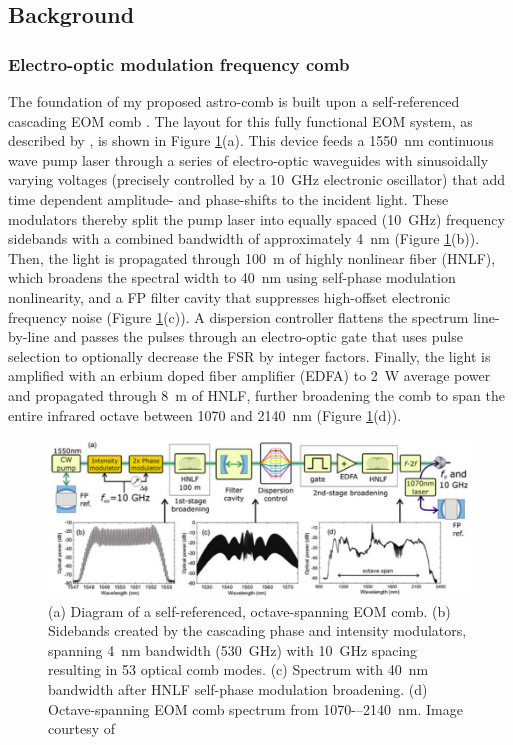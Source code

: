 \documentclass[11pt]{article}
\begin{document}
\subsection{Background}
\label{subsec:astro-comb_bkgd}

\subsubsection{Electro-optic modulation frequency comb}

The foundation of my proposed astro-comb is built upon a self-referenced cascading EOM comb \citep{Cole2015, Beha2017, Carlson2017a}. The layout for this fully functional EOM system, as described by \citet{Cole2015}, is shown in Figure \ref{fig:cole_eom}(a). This device feeds a \SI{1550}{\nano\meter} continuous wave pump laser through a series of electro-optic waveguides with sinusoidally varying voltages (precisely controlled by a \SI{10}{\giga\hertz} electronic oscillator) that add time dependent amplitude- and phase-shifts to the incident light. These modulators thereby split the pump laser into equally spaced (\SI{10}{\giga\hertz}) frequency sidebands with a combined bandwidth of approximately \SI{4}{\nano\meter} (Figure \ref{fig:cole_eom}(b)). Then, the light is propagated through \SI{100}{\meter} of highly nonlinear fiber (HNLF), which broadens the spectral width to \SI{40}{\nano\meter} using self-phase modulation nonlinearity, and a FP filter cavity that suppresses high-offset electronic frequency noise (Figure \ref{fig:cole_eom}(c)). A dispersion controller flattens the spectrum line-by-line and passes the pulses through an electro-optic gate that uses pulse selection to optionally decrease the FSR by integer factors. Finally, the light is amplified with an erbium doped fiber amplifier (EDFA) to \SI{2}{\watt} average power and propagated through \SI{8}{\meter} of HNLF, further broadening the comb to span the entire infrared octave between 1070 and \SI{2140}{\nano\meter} (Figure \ref{fig:cole_eom}(d)).

\begin{figure}
    \centering
    \includegraphics[width=\textwidth]{images/cole_eom.png}
    \caption{(a) Diagram of a self-referenced, octave-spanning EOM comb. (b) Sidebands created by the cascading phase and intensity modulators, spanning \SI{4}{\nano\meter} bandwidth (\SI{530}{\giga\hertz}) with \SI{10}{\giga\hertz} spacing resulting in 53 optical comb modes. (c) Spectrum with \SI{40}{\nano\meter} bandwidth after HNLF self-phase modulation broadening. (d) Octave-spanning EOM comb spectrum from 1070-–\SI{2140}{\nano\meter}. Image courtesy of \citet{Cole2015}}
    \label{fig:cole_eom}
\end{figure}
\end{document}
